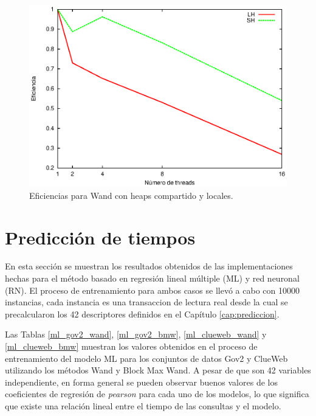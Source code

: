 \begin{figure}[!ht]
\centering
\includegraphics[scale=.75]{images/eficiencias_wand.eps}
\caption{Eficiencias para Wand con heaps compartido y locales.}
\label{fig:eficiencias_wand}
\end{figure}

\section{Predicción de tiempos}
\label{evaluacionexperimental:predicciontiempos}
En esta sección se muestran los resultados obtenidos de las implementaciones hechas para el método basado en regresión lineal múltiple (ML) y red neuronal (RN). El proceso de entrenamiento para ambos casos se llevó a cabo con 10000 instancias, cada instancia es una transaccion de lectura real desde la cual se precalcularon los 42 descriptores definidos en el Capítulo \ref{cap:prediccion}. 

Las Tablas \ref{ml_gov2_wand}, \ref{ml_gov2_bmw}, \ref{ml_clueweb_wand} y \ref{ml_clueweb_bmw} muestran los valores obtenidos en el proceso de entrenamiento del modelo ML para los conjuntos de datos Gov2 y ClueWeb utilizando los métodos Wand y Block Max Wand. A pesar de que son 42 variables independiente, en forma general se pueden observar buenos valores de los coeficientes de regresión de \textit{pearson} para cada uno de los modelos, lo que significa que existe una relación lineal entre el tiempo de las consultas y el modelo.  



